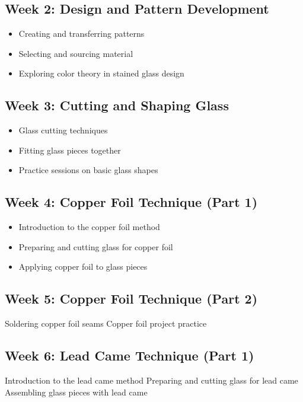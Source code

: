 \documentclass[11pt]{article}
\begin{document}
    \subsection*{Week 2: Design and Pattern Development}
        \begin{itemize}
            \item Creating and transferring patterns
            \item Selecting and sourcing material
            \item Exploring color theory in stained glass design
        \end{itemize}

    \subsection*{Week 3: Cutting and Shaping Glass}
    \begin{itemize}
        \item Glass cutting techniques
        \item Fitting glass pieces together
        \item Practice sessions on basic glass shapes
    \end{itemize}

    \subsection*{Week 4: Copper Foil Technique (Part 1)}
    \begin{itemize}
        \item Introduction to the copper foil method
        \item Preparing and cutting glass for copper foil
        \item Applying copper foil to glass pieces

    \end{itemize}

    \subsection*{Week 5: Copper Foil Technique (Part 2)}
    Soldering copper foil seams
    Copper foil project practice
    \begin{itemize}

    \end{itemize}

    \subsection*{Week 6: Lead Came Technique (Part 1)}
    Introduction to the lead came method
    Preparing and cutting glass for lead came
    Assembling glass pieces with lead came
    \begin{itemize}

    \end{itemize}
\end{document}
